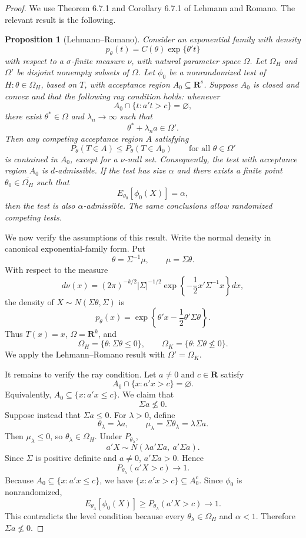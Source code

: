 \documentclass[11pt]{article}
\newtheorem{proposition}{Proposition}
\begin{document}
\begin{proof}
We use Theorem 6.7.1 and Corollary 6.7.1 of Lehmann and Romano.  The relevant result is the following.

\begin{proposition}[Lehmann--Romano]
Consider an exponential family with density
\[
p_\theta(t)=C(\theta)\exp\{\theta't\}
\]
with respect to a $\sigma$-finite measure $\nu$, with natural parameter space $\Omega$. Let $\Omega_H$ and $\Omega'$ be disjoint nonempty subsets of $\Omega$. Let $\phi_0$ be a nonrandomized test of $H:\theta\in\Omega_H$, based on $T$, with acceptance region $A_0\subseteq\mathbf R^s$. Suppose $A_0$ is closed and convex and that the following ray condition holds: whenever
\[
A_0\cap\{t:a't>c\}=\varnothing,
\]
there exist $\theta^*\in\Omega$ and $\lambda_n\to\infty$ such that
\[
\theta^*+\lambda_n a\in\Omega'.
\]
Then any competing acceptance region $A$ satisfying
\[
P_\theta(T\in A)\le P_\theta(T\in A_0)
\qquad\text{for all }\theta\in\Omega'
\]
is contained in $A_0$, except for a $\nu$-null set. Consequently, the test with acceptance region $A_0$ is $d$-admissible. If the test has size $\alpha$ and there exists a finite point $\theta_0\in\overline{\Omega_H}$ such that
\[
E_{\theta_0}[\phi_0(X)]=\alpha,
\]
then the test is also $\alpha$-admissible. The same conclusions allow randomized competing tests.
\end{proposition}

We now verify the assumptions of this result.  Write the normal density in canonical exponential-family form. Put
\[
\theta=\Sigma^{-1}\mu,
\qquad
\mu=\Sigma\theta.
\]
With respect to the measure
\[
d\nu(x)=(2\pi)^{-k/2}|\Sigma|^{-1/2}\exp\left\{-\frac12 x'\Sigma^{-1}x\right\}dx,
\]
the density of $X\sim N(\Sigma\theta,\Sigma)$ is
\[
p_\theta(x)=\exp\left\{\theta'x-\frac12\theta'\Sigma\theta\right\}.
\]
Thus $T(x)=x$, $\Omega=\mathbf R^k$, and
\[
\Omega_H=\{\theta:\Sigma\theta\le 0\},
\qquad
\Omega_K=\{\theta:\Sigma\theta\not\le 0\}.
\]
We apply the Lehmann--Romano result with $\Omega'=\Omega_K$.

It remains to verify the ray condition.  Let $a\ne 0$ and $c\in\mathbf R$ satisfy
\[
A_0\cap\{x:a'x>c\}=\varnothing.
\]
Equivalently, $A_0\subseteq\{x:a'x\le c\}$.  We claim that
\[
\Sigma a\not\le 0.
\]
Suppose instead that $\Sigma a\le 0$.  For $\lambda>0$, define
\[
\theta_\lambda=\lambda a,
\qquad
\mu_\lambda=\Sigma\theta_\lambda=\lambda\Sigma a.
\]
Then $\mu_\lambda\le 0$, so $\theta_\lambda\in\Omega_H$.  Under $P_{\theta_\lambda}$,
\[
a'X\sim N\left(\lambda a'\Sigma a,\ a'\Sigma a\right).
\]
Since $\Sigma$ is positive definite and $a\ne 0$, $a'\Sigma a>0$. Hence
\[
P_{\theta_\lambda}(a'X>c)\to 1.
\]
Because $A_0\subseteq\{x:a'x\le c\}$, we have $\{x:a'x>c\}\subseteq A_0^c$. Since $\phi_0$ is nonrandomized,
\[
E_{\theta_\lambda}[\phi_0(X)]
\ge P_{\theta_\lambda}(a'X>c)
\to 1.
\]
This contradicts the level condition because every $\theta_\lambda\in\Omega_H$ and $\alpha<1$. Therefore $\Sigma a\not\le 0$.


\end{proof}
\end{document}
